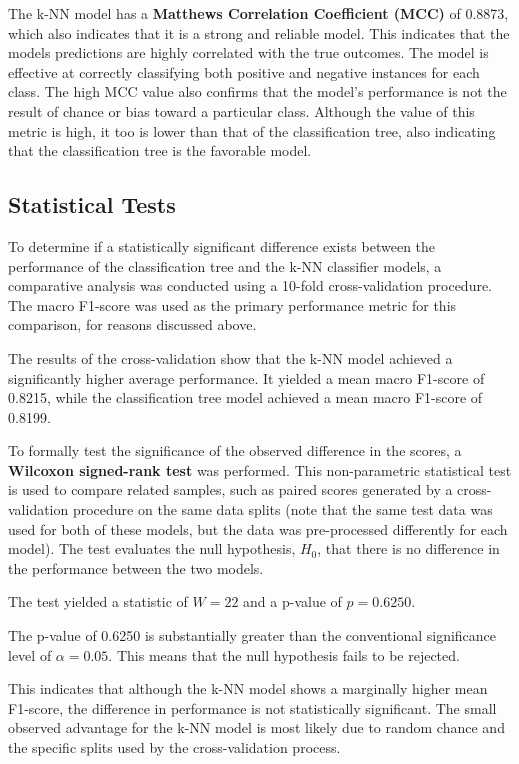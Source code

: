 \documentclass[conference]{IEEEtran}
\begin{document}
The k-NN model has a \textbf{Matthews Correlation Coefficient (MCC)} of 0.8873, which also indicates that it is a strong and reliable model. This indicates that the models predictions are highly correlated with the true outcomes. The model is effective at correctly classifying both positive and negative instances for each class. The high MCC value also confirms that the model's performance is not the result of chance or bias toward a particular class. Although the value of this metric is high, it too is lower than that of the classification tree, also indicating that the classification tree is the favorable model. 

\subsection{\textbf{Statistical Tests}}

To determine if a statistically significant difference exists between the performance of the classification tree and the k-NN classifier models, a comparative analysis was conducted using a 10-fold cross-validation procedure. The macro F1-score was used as the primary performance metric for this comparison, for reasons discussed above.

The results of the cross-validation show that the k-NN model achieved a significantly higher average performance. It yielded a mean macro F1-score of 0.8215, while the classification tree model achieved a mean macro F1-score of 0.8199.

To formally test the significance of the observed difference in the scores, a \textbf{Wilcoxon signed-rank test} was performed. This non-parametric statistical test is used to compare related samples, such as paired scores generated by a cross-validation procedure on the same data splits (note that the same test data was used for both of these models, but the data was pre-processed differently for each model). The test evaluates the null hypothesis, $H_0$, that there is no difference in the performance between the two models.

The test yielded a statistic of $W = 22$ and a p-value of $p = 0.6250$.

The p-value of 0.6250 is substantially greater than the conventional significance level of $\alpha = 0.05$. This means that the null hypothesis fails to be rejected.

This indicates that although the k-NN model shows a marginally higher mean F1-score, the difference in performance is not statistically significant. The small observed advantage for the k-NN model is most likely due to random chance and the specific splits used by the cross-validation process.
\end{document}
